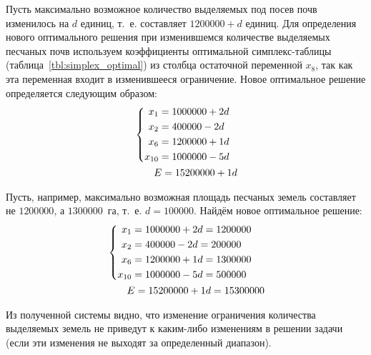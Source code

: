 Пусть максимально возможное количество выделяемых под посев почв изменилось на $ d $ единиц, т.~е. составляет $ 1 200 000 + d $ единиц. Для определения нового оптимального решения при изменившемся количестве выделяемых песчаных почв используем коэффициенты оптимальной симплекс-таблицы (таблица~\ref{tbl:simplex_optimal}) из столбца остаточной переменной $ x_8 $, так как эта переменная входит в изменившееся ограничение. Новое оптимальное решение определяется следующим образом:
\begin{equation}
\label{eq:analysis_second}
	\begin{aligned}
  	&\left\{
    	\begin{aligned}
	      x_1 & = 1 000 000 + 2d \\
	      x_2 & = 400 000 - 2d \\
	      x_6 & = 1 200 000 + 1d \\
	      x_{10} & = 1 000 000 - 5d \\ 
    	\end{aligned}
  	\right.
  	\\
  	& \hspace{7mm} E = 15 200 000 + 1d
	\end{aligned}
\end{equation}

Пусть, например, максимально возможная площадь песчаных земель составляет не $ 1 200 000 $, а $ 1 300 000 $~га, т.~е. $ d = 100 000 $. Найдём новое оптимальное решение:
\begin{equation}
\label{eq:analysis_second_result}
	\begin{aligned}
  	&\left\{
    	\begin{aligned}
	      x_1 & = 1 000 000 + 2d = 1 200 000 \\
	      x_2 & = 400 000 - 2d = 200 000\\
	      x_6 & = 1 200 000 + 1d = 1 300 000 \\
	      x_{10} & = 1 000 000 - 5d = 500 000\\ 
    	\end{aligned}
  	\right.
  	\\
  	& \hspace{7mm} E = 15 200 000 + 1d = 15 300 000
	\end{aligned}
\end{equation}

Из полученной системы видно, что изменение ограничения количества выделяемых земель не приведут к каким-либо изменениям в решении задачи (если эти изменения не выходят за определенный диапазон).


